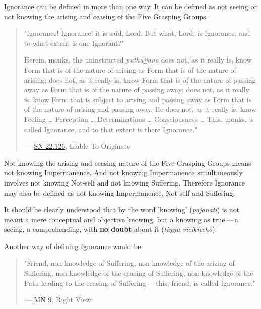 Ignorance can be defined in more than one way. It can be defined as not seeing or not knowing the arising and ceasing of the Five Grasping Groups.

\begin{quote}
"Ignorance! Ignorance! it is said, Lord. But what, Lord, is Ignorance, and to what extent is one Ignorant?"

Herein, monks, the uninstructed \emph{puthujjana} does not, as it really is, know Form that is of the nature of arising as Form that is of the nature of arising; does not, as it really is, know Form that is of the nature of passing away as Form that is of the nature of passing away; does not, as it really is, know Form that is subject to arising and passing away as Form that is of the nature of arising and passing away. He does not, as it really is, know Feeling \ldots\hspace{0pt} Perception \ldots\hspace{0pt} Determinations \ldots\hspace{0pt} Consciousness \ldots\hspace{0pt} This, monks, is called Ignorance, and to that extent is there Ignorance."

 --- \href{https://suttacentral.net/sn22.126/en/sujato}{SN 22.126}, Liable To Originate
\end{quote}

Not knowing the arising and ceasing nature of the Five Grasping Groups means not knowing Impermanence. And not knowing Impermanence simultaneously involves not knowing Not-self and not knowing Suffering. Therefore Ignorance may also be defined as not knowing Impermanence, Not-self and Suffering.

It should be clearly understood that by the word 'knowing' (\emph{pajānāti}) is not meant a mere conceptual and objective knowing, but a knowing as true --- a seeing, a comprehending, with \textbf{no doubt} about it (\emph{tiṇṇa vicikiccho}).

Another way of defining Ignorance would be:

\begin{quote}
"Friend, non-knowledge of Suffering, non-knowledge of the arising of Suffering, non-knowledge of the ceasing of Suffering, non-knowledge of the Path leading to the ceasing of Suffering --- this, friend, is called Ignorance."

 --- \href{https://suttacentral.net/mn9/en/bodhi}{MN 9}, Right View
\end{quote}

